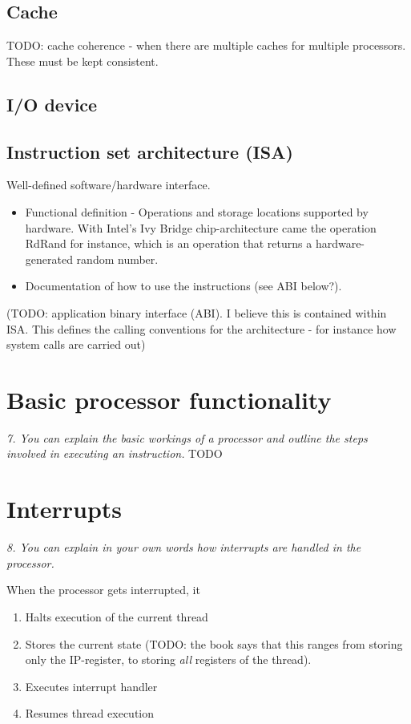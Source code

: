 \documentclass{article}
\begin{document}
\subsection{Cache}
TODO: cache coherence - when there are multiple caches for multiple processors. These must be kept consistent.

\subsection{I/O device}

\subsection{Instruction set architecture (ISA)}
Well-defined software/hardware interface.

\begin{itemize}
	\item Functional definition - Operations and storage locations supported by hardware. With Intel's Ivy Bridge chip-architecture came the operation RdRand for instance, which is an operation that returns a hardware-generated random number.
	\item Documentation of how to use the instructions (see ABI below?).
\end{itemize}

(TODO: application binary interface (ABI). I believe this is contained within ISA. This defines the calling conventions for the architecture - for instance how system calls are carried out)


\section{Basic processor functionality}
\emph{7. You can explain the basic workings of a processor and outline the steps involved in executing an instruction.}
TODO


\section{Interrupts}
\emph{8. You can explain in your own words how interrupts are handled in the processor.}

When the processor gets interrupted, it
\begin{enumerate}
	\item Halts execution of the current thread
	\item Stores the current state (TODO: the book says that this ranges from storing only the IP-register, to storing \emph{all} registers of the thread).
	\item Executes interrupt handler
	\item Resumes thread execution
\end{enumerate}
\end{document}
